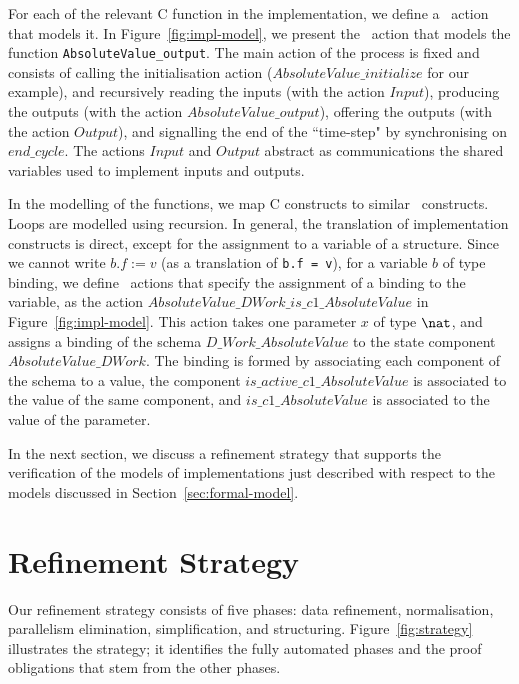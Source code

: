 \documentclass[submission]{eptcs}
\begin{document}
For each of the relevant C function in the implementation, we define a \Circus~action that models it. In Figure~\ref{fig:impl-model}, we present the \Circus~action that models the function
\texttt{AbsoluteValue\_output}. The main action of the process is fixed and consists of calling the initialisation action ($AbsoluteValue\_initialize$ for our example), and recursively reading the inputs (with the action $Input$), producing the outputs (with the action $AbsoluteValue\_output$), offering the outputs (with the action $Output$), and signalling the end of the ``time-step" by synchronising on $end\_cycle$. The actions $Input$ and $Output$ abstract as communications the shared variables used to implement inputs and outputs.



In the modelling of the functions, we map C constructs to
similar \Circus~constructs. Loops are modelled using recursion. In general,
the translation of implementation constructs is direct, except for the assignment
to a variable of a structure. Since we cannot write $b.f := v$ (as a translation
of \texttt{b.f = v}), for a variable $b$ of type binding, we define \Circus~actions
that specify the assignment of a binding to the variable, as the action
$AbsoluteValue\_DWork\_is\_c1\_AbsoluteValue$ in Figure~\ref{fig:impl-model}. This action takes one parameter
$x$ of type $\nat$, and assigns a binding of the schema $D\_Work\_AbsoluteValue$
to the state component $AbsoluteValue\_DWork$. The binding is formed by associating each component
of the schema to a value, the component $is\_active\_c1\_AbsoluteValue$ is associated to the value of
the same component, and $is\_c1\_AbsoluteValue$ is associated to the value of the parameter.

In the next section, we discuss a refinement strategy that supports the verification of the models of implementations just described with respect to the models discussed in Section~\ref{sec:formal-model}.



\section{Refinement Strategy}
\label{sec:strategy}

Our refinement strategy consists of five phases: data refinement, normalisation, parallelism elimination, simplification, and structuring. Figure~\ref{fig:strategy} illustrates the strategy; it identifies the fully automated phases and the proof obligations that stem from the other phases.
\end{document}
